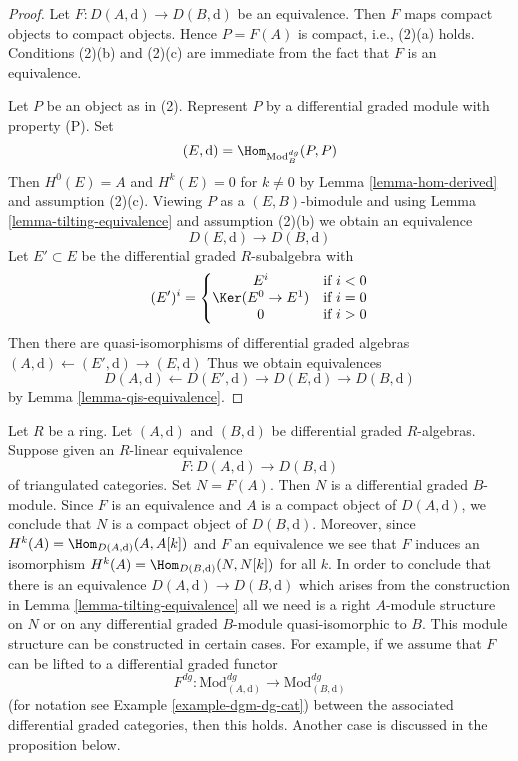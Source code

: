 \begin{proof}
Let $F : D(A, \text{d}) \to D(B, \text{d})$ be an equivalence.
Then $F$ maps compact objects to compact objects. Hence $P = F(A)$ is
compact, i.e., (2)(a) holds. Conditions (2)(b) and (2)(c) are immediate
from the fact that $F$ is an equivalence.

\medskip\noindent
Let $P$ be an object as in (2). Represent $P$ by a
differential graded module with property (P). Set
$$
(E, \text{d}) = \Hom_{\text{Mod}^{dg}_B}(P, P)
$$
Then $H^0(E) = A$ and $H^k(E) = 0$ for $k \not = 0$ by
Lemma \ref{lemma-hom-derived} and assumption (2)(c).
Viewing $P$ as a $(E, B)$-bimodule and using
Lemma \ref{lemma-tilting-equivalence} and assumption (2)(b)
we obtain an equivalence
$$
D(E, \text{d}) \to D(B, \text{d})
$$
Let $E' \subset E$ be the differential graded $R$-subalgebra
with
$$
(E')^i = \left\{
\begin{matrix}
E^i & \text{if }i < 0 \\
\Ker(E^0 \to E^1) & \text{if }i = 0 \\
0 & \text{if }i > 0
\end{matrix}
\right.
$$
Then there are quasi-isomorphisms of differential graded
algebras $(A, \text{d}) \leftarrow (E', \text{d}) \rightarrow (E, \text{d})$
Thus we obtain equivalences
$$
D(A, \text{d}) \leftarrow D(E', \text{d}) \rightarrow D(E, \text{d})
\rightarrow D(B, \text{d})
$$
by Lemma \ref{lemma-qis-equivalence}.
\end{proof}

\begin{remark}
\label{remark-lift-equivalence-to-dga}
Let $R$ be a ring. Let $(A, \text{d})$ and $(B, \text{d})$ be differential
graded $R$-algebras. Suppose given an $R$-linear equivalence
$$
F : D(A, \text{d}) \longrightarrow D(B, \text{d})
$$
of triangulated categories. Set $N = F(A)$. Then $N$ is a differential
graded $B$-module. Since $F$ is an equivalence and $A$ is a compact
object of $D(A, \text{d})$, we conclude that $N$ is a compact object
of $D(B, \text{d})$. Moreover, since
$H^k(A) = \Hom_{D(A, \text{d})}(A, A[k])$ and $F$ an equivalence
we see that $F$ induces an isomorphism
$H^k(A) = \Hom_{D(B, \text{d})}(N, N[k])$ for all $k$.
In order to conclude that there is an equivalence
$D(A, \text{d}) \longrightarrow D(B, \text{d})$ which
arises from the construction in
Lemma \ref{lemma-tilting-equivalence}
all we need is a right $A$-module structure on $N$ or on any
differential graded $B$-module quasi-isomorphic to $B$.
This module structure can be constructed in certain cases.
For example, if we assume that $F$ can be lifted to a
differential graded functor
$$
F^{dg} :
\text{Mod}^{dg}_{(A, \text{d})}
\longrightarrow
\text{Mod}^{dg}_{(B, \text{d})}
$$
(for notation see Example \ref{example-dgm-dg-cat})
between the associated differential graded categories,
then this holds. Another case is discussed in the proposition below.
\end{remark}

